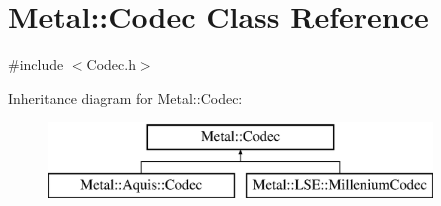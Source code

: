 \hypertarget{classMetal_1_1Codec}{}\section{Metal\+:\+:Codec Class Reference}
\label{classMetal_1_1Codec}


{\ttfamily \#include $<$Codec.\+h$>$}

Inheritance diagram for Metal\+:\+:Codec\+:\begin{figure}[H]
\begin{center}
\leavevmode
\includegraphics[height=2.000000cm]{classMetal_1_1Codec}
\end{center}
\end{figure}
